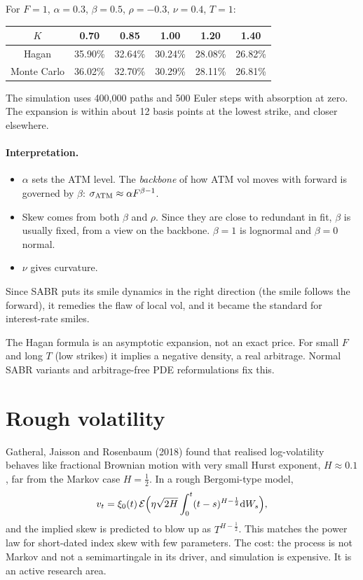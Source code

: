 \begin{numcheck}
For $F=1$, $\alpha=0.3$, $\beta=0.5$, $\rho=-0.3$, $\nu=0.4$, $T=1$:
\begin{center}
\begin{tabular}{cccccc}
\toprule
$K$ & 0.70 & 0.85 & 1.00 & 1.20 & 1.40\\
\midrule
Hagan & 35.90\% & 32.64\% & 30.24\% & 28.08\% & 26.82\%\\
Monte Carlo & 36.02\% & 32.70\% & 30.29\% & 28.11\% & 26.81\%\\
\bottomrule
\end{tabular}
\end{center}
The simulation uses 400{,}000 paths and 500 Euler steps with absorption at zero. The expansion is within about 12 basis points at the lowest strike, and closer elsewhere.
\end{numcheck}

\paragraph{Interpretation.}
\begin{itemize}
\item $\alpha$ sets the ATM level. The \emph{backbone} of how ATM vol moves with forward is governed by $\beta$: $\sigma_{\rm ATM}\approx\alpha F^{\beta-1}$.
\item Skew comes from both $\beta$ and $\rho$. Since they are close to redundant in fit, $\beta$ is usually fixed, from a view on the backbone. $\beta=1$ is lognormal and $\beta=0$ normal.
\item $\nu$ gives curvature.
\end{itemize}
Since SABR puts its smile dynamics in the right direction (the smile follows the forward), it remedies the flaw of local vol, and it became the standard for interest-rate smiles.

\begin{pitfall}
The Hagan formula is an asymptotic expansion, not an exact price. For small $F$ and long $T$ (low strikes) it implies a negative density, a real arbitrage. Normal SABR variants and arbitrage-free PDE reformulations fix this.
\end{pitfall}

\section{Rough volatility}\label{sec:rough}

Gatheral, Jaisson and Rosenbaum (2018) found that realised log-volatility behaves like fractional Brownian motion with very small Hurst exponent, $H\approx0.1$, far from the Markov case $H=\frac12$. In a rough Bergomi-type model,
\[
v_t=\xi_0(t)\,\mathcal{E}\Bigl(\eta\sqrt{2H}\int_0^t(t-s)^{H-\frac12}\mathrm{d} W_s\Bigr),
\]
and the implied skew is predicted to blow up as $T^{H-\frac12}$. This matches the power law for short-dated index skew with few parameters. The cost: the process is not Markov and not a semimartingale in its driver, and simulation is expensive. It is an active research area.


